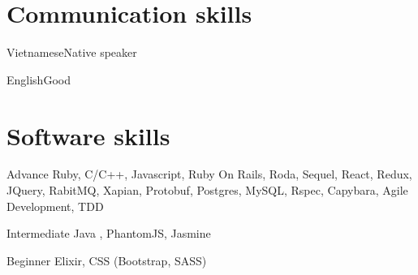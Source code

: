 \documentclass{tccv}
\begin{document}
\section{Communication skills}

\begin{factlist}
\item{Vietnamese}{Native speaker}
\item{English}{Good}
\end{factlist}

\section{Software skills}

\begin{factlist}

\item{Advance}
     {Ruby, C/C++, Javascript,
     Ruby On Rails, Roda, Sequel, React, Redux, JQuery,
     RabitMQ, Xapian, Protobuf,
     Postgres, MySQL,
     \newline Rspec, Capybara,
     \newline Agile Development, TDD}

\item{Intermediate}
     {Java , PhantomJS, Jasmine}

\item{Beginner}
     {Elixir, CSS (Bootstrap, SASS)}
\end{factlist}
\end{document}
